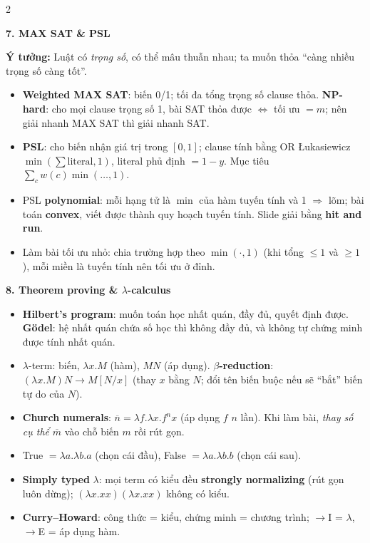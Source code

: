 \documentclass[10pt]{article}
\newcommand{\kw}[1]{\textbf{#1}}
\newcommand{\sect}[1]{\par\vspace{6pt}\noindent\colorbox{h1}{\parbox{\dimexpr\linewidth-2\fboxsep}{\large\bfseries\color{white}#1}}\par\vspace{2pt}}
\newcommand{\idea}[1]{\par\noindent\colorbox{bg}{\parbox{\dimexpr\linewidth-2\fboxsep}{\textbf{Ý tưởng:} #1}}\par}
\begin{document}
\begin{multicols}{2}
\sect{7. MAX SAT \& PSL}
\idea{Luật có \emph{trọng số}, có thể mâu thuẫn nhau; ta muốn thỏa ``càng nhiều trọng số càng tốt''.}
\begin{itemize}
\item \kw{Weighted MAX SAT}: biến 0/1; tối đa tổng trọng số clause thỏa. \kw{NP-hard}: cho mọi clause trọng số 1, bài SAT thỏa được $\iff$ tối ưu $=m$; nên giải nhanh MAX SAT thì giải nhanh SAT.
\item \kw{PSL}: cho biến nhận giá trị trong $[0,1]$; clause tính bằng OR Łukasiewicz $\min(\sum\text{literal},1)$, literal phủ định $=1-y$. Mục tiêu $\sum_cw(c)\min(\ldots,1)$.
\item PSL \kw{polynomial}: mỗi hạng tử là $\min$ của hàm tuyến tính và 1 $\Rightarrow$ lõm; bài toán \kw{convex}, viết được thành quy hoạch tuyến tính. Slide giải bằng \kw{hit and run}.
\item Làm bài tối ưu nhỏ: chia trường hợp theo $\min(\cdot,1)$ (khi tổng $\le1$ và $\ge1$), mỗi miền là tuyến tính nên tối ưu ở đỉnh.
\end{itemize}

\sect{8. Theorem proving \& $\lambda$-calculus}
\begin{itemize}
\item \kw{Hilbert's program}: muốn toán học nhất quán, đầy đủ, quyết định được. \kw{Gödel}: hệ nhất quán chứa số học thì không đầy đủ, và không tự chứng minh được tính nhất quán.
\item $\lambda$-term: biến, $\lambda x.M$ (hàm), $MN$ (áp dụng). \kw{$\beta$-reduction}: $(\lambda x.M)N\to M[N/x]$ (thay $x$ bằng $N$; đổi tên biến buộc nếu sẽ ``bắt'' biến tự do của $N$).
\item \kw{Church numerals}: $\overline n=\lambda f.\lambda x.f^nx$ (áp dụng $f$ $n$ lần). Khi làm bài, \emph{thay số cụ thể} $\overline m$ vào chỗ biến $m$ rồi rút gọn.
\item True $=\lambda a.\lambda b.a$ (chọn cái đầu), False $=\lambda a.\lambda b.b$ (chọn cái sau).
\item \kw{Simply typed} $\lambda$: mọi term có kiểu đều \kw{strongly normalizing} (rút gọn luôn dừng); $(\lambda x.xx)(\lambda x.xx)$ không có kiểu.
\item \kw{Curry--Howard}: công thức = kiểu, chứng minh = chương trình; $\to$I = $\lambda$, $\to$E = áp dụng hàm.
\end{itemize}


\end{multicols}
\end{document}
